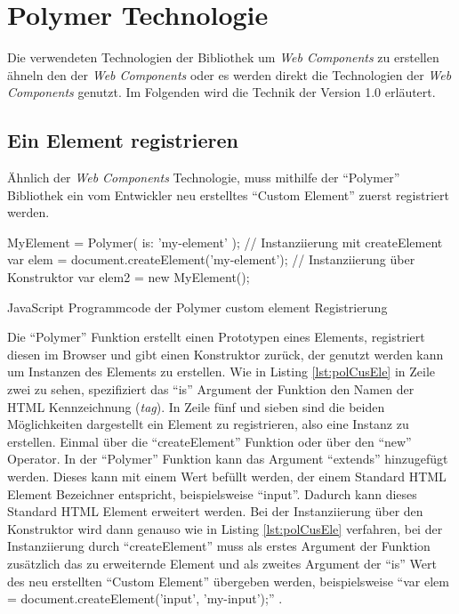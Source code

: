 \documentclass[12pt, paper=a4, bibtotoc, toc=listof, headsepline=true, numbers=endperiod]{scrreprt}
\begin{document}
	\section{Polymer Technologie} Die verwendeten Technologien der Bibliothek um \emph{Web Components} zu erstellen ähneln den der \emph{Web Components} oder es werden direkt die Technologien der \emph{Web Components} genutzt. Im Folgenden wird die Technik der Version 1.0 erläutert.
		\subsection{Ein Element registrieren}
		Ähnlich der \emph{Web Components} Technologie, muss mithilfe der \enquote{Polymer} Bibliothek ein vom Entwickler neu erstelltes \enquote{Custom Element} zuerst registriert werden. 
		\begin{listing}
		\begin{JavaScriptcode*}{}
MyElement = Polymer({
	is: 'my-element'
});
// Instanziierung mit createElement
var elem = document.createElement('my-element');
// Instanziierung über Konstruktor
var elem2 = new MyElement();
		\end{JavaScriptcode*}
		\caption[Polymer custom element Registrierung]{JavaScript Programmcode der Polymer custom element Registrierung}
		\label{lst:polCusEle}
		\end{listing}\noindent
Die \enquote{Polymer} Funktion erstellt einen Prototypen eines Elements, registriert diesen im Browser und gibt einen Konstruktor zurück, der genutzt werden kann um Instanzen des Elements zu erstellen. Wie in Listing \ref{lst:polCusEle} in Zeile zwei zu sehen, spezifiziert das \enquote{is} Argument der Funktion den Namen der \ac{HTML} Kennzeichnung (\emph{tag}). In Zeile fünf und sieben sind die beiden Möglichkeiten dargestellt ein Element zu registrieren, also eine Instanz zu erstellen. Einmal über die \enquote{createElement} Funktion oder über den \enquote{new} Operator. In der \enquote{Polymer} Funktion kann das Argument \enquote{extends} hinzugefügt werden. Dieses kann mit einem Wert befüllt werden, der einem Standard \ac{HTML} Element Bezeichner entspricht, beispielsweise \enquote{input}. Dadurch kann dieses Standard \ac{HTML} Element erweitert werden. Bei der Instanziierung über den Konstruktor wird dann genauso wie in Listing \ref{lst:polCusEle} verfahren, bei der Instanziierung durch \enquote{createElement} muss als erstes Argument der Funktion zusätzlich das zu erweiternde Element und als zweites Argument der \enquote{is} Wert des neu erstellten \enquote{Custom Element} übergeben werden, beispielsweise \enquote{var elem = document.createElement('input', 'my-input');} \cite{polyReg}.
\end{document}

